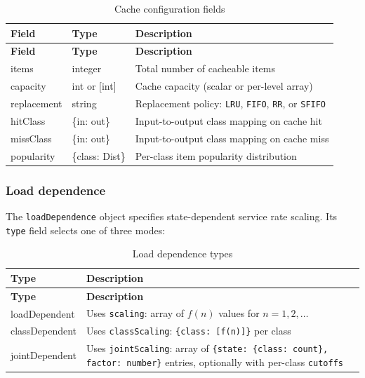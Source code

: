 \begin{footnotesize}
\begin{longtable}{|T{2.2cm}|T{3.2cm}|D{7.5cm}|}
\caption{Cache configuration fields}\label{tab:json-cache}
\\\hline
\textbf{Field} & \textbf{Type} & \textbf{Description} \\\hline
\endfirsthead
\hline \textbf{Field} & \textbf{Type} & \textbf{Description} \\\hline
\endhead
\hline
\endfoot
items       & integer & Total number of cacheable items \\\hline
capacity    & int or [int] & Cache capacity (scalar or per-level array) \\\hline
replacement & string & Replacement policy: \texttt{LRU}, \texttt{FIFO}, \texttt{RR}, or \texttt{SFIFO} \\\hline
hitClass    & \{in: out\} & Input-to-output class mapping on cache hit \\\hline
missClass   & \{in: out\} & Input-to-output class mapping on cache miss \\\hline
popularity  & \{class: Dist\} & Per-class item popularity distribution \\\hline
\end{longtable}
\end{footnotesize}

\subsubsection{Load dependence}
\label{json:loaddep}

The \texttt{loadDependence} object specifies state-dependent service rate scaling. Its \texttt{type} field selects one of three modes:

\begin{footnotesize}
\begin{longtable}{|T{2.8cm}|D{10.1cm}|}
\caption{Load dependence types}\label{tab:json-loaddep}
\\\hline
\textbf{Type} & \textbf{Description} \\\hline
\endfirsthead
\hline \textbf{Type} & \textbf{Description} \\\hline
\endhead
\hline
\endfoot
loadDependent  & Uses \texttt{scaling}: array of $f(n)$ values for $n=1,2,\ldots$ \\\hline
classDependent & Uses \texttt{classScaling}: \texttt{\{class: [f(n)]\}} per class \\\hline
jointDependent & Uses \texttt{jointScaling}: array of \texttt{\{state: \{class: count\}, factor: number\}} entries, optionally with per-class \texttt{cutoffs} \\\hline
\end{longtable}
\end{footnotesize}

